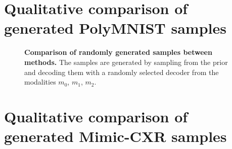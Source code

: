 \chapter{Qualitative comparison of generated PolyMNIST samples}



\begin{figure}[h!]
    \centering
    \caption{\textbf{Comparison of randomly generated samples between methods.} The samples are generated by sampling from the prior and decoding them with a randomly selected decoder from the modalities $m_0$, $m_1$, $m_2$.
    }
\end{figure}

\chapter{Qualitative comparison of generated Mimic-CXR samples}
